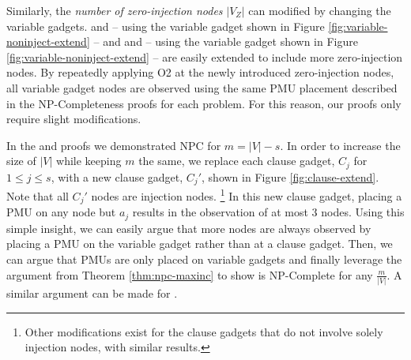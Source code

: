 Similarly, the {\em number of zero-injection nodes} $|V_Z|$ can modified by changing the variable gadgets. \full and \maxinc -- using the variable gadget shown in Figure \ref{fig:variable-noninject-extend} -- and
\xval and \xvalpart -- using the variable gadget shown in Figure \ref{fig:variable-noninject-extend} -- are easily extended to include more zero-injection nodes.  By repeatedly applying O2 at the
newly introduced zero-injection nodes, all variable gadget nodes are observed using the same PMU placement described in the NP-Completeness proofs for each problem.  For this reason, our
proofs only require slight modifications.

In the \xvalpart and \maxinc proofs we demonstrated NPC for $m=|V|-s$.
In order to increase the size of $|V|$ while keeping $m$ the same, we replace each clause gadget, $C_j$ for $1 \leq j \leq s$, with a new clause gadget, $C_j'$,
shown in Figure \ref{fig:clause-extend}.  Note that all $C_j'$ nodes are injection nodes. 
{\footnote {\small Other modifications exist for the clause gadgets that do not involve solely injection nodes, with similar results.}}
In this new clause gadget, placing a PMU on any node but $a_j$ results in the observation of at most $3$ nodes.
Using this simple insight, we can easily argue that more nodes are always observed by placing a PMU on the variable gadget
rather than at a clause gadget. Then, we can argue that PMUs are only placed on variable gadgets and finally leverage the
argument from Theorem \ref{thm:npc-maxinc} to show \maxinc is NP-Complete for any $\frac{m}{|V|}$. A similar argument can be made for \xvalparts. 



